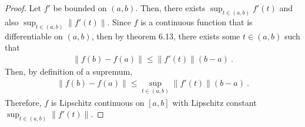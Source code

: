 \begin{questions}


\begin{solution}
  \begin{proof}
Let $f'$ be bounded on $(a, b)$. Then, there exists $\sup_{t \in (a,b)}f'(t)$ and also $\sup_{t \in (a,b)}\|f'(t)\|$. Since $f$ is a continuous function that is differentiable on $(a,b)$, then by theorem 6.13, there exists some $t \in (a,b)$ such that
\begin{align*}
\|f(b) - f(a)\| \leq \|f'(t)\|(b-a)~.
\end{align*}
Then, by definition of a supremum,
\begin{align*}
\|f(b) - f(a)\| \leq \sup_{t \in (a,b)}\|f'(t)\|(b-a)~.
\end{align*}
Therefore, $f$ is Lipschitz continuous on $[a,b]$ with Lipschitz constant $\sup_{t \in (a,b)}\|f'(t)\|$.

\end{proof}
\end{solution}
\end{questions}